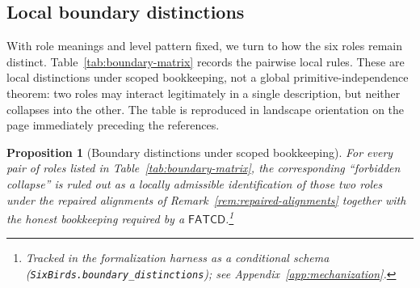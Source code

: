\documentclass[11pt]{article}
\newtheorem{proposition}[theorem]{Proposition}
\theoremstyle{definition}
\newcommand{\FATCD}{\ensuremath{\mathsf{FATCD}}}
\begin{document}
\subsection{Local boundary distinctions}\label{subsec:boundary-matrix}

With role meanings and level pattern fixed, we turn to how the six
roles remain distinct. Table~\ref{tab:boundary-matrix} records the
pairwise local rules. These are local distinctions under scoped
bookkeeping, not a global primitive-independence theorem: two roles
may interact legitimately in a single description, but neither
collapses into the other. The table is reproduced in landscape
orientation on the page immediately preceding the references.

\begin{proposition}[Boundary distinctions under scoped bookkeeping]\label{prop:boundary-distinctions}
For every pair of roles listed in Table~\ref{tab:boundary-matrix}, the
corresponding ``forbidden collapse'' is ruled out as a locally admissible
identification of those two roles under the repaired alignments of
Remark~\ref{rem:repaired-alignments} together with the honest bookkeeping
required by a \FATCD{}.\footnote{Tracked in the formalization harness as a conditional schema (\texttt{SixBirds.boundary\_distinctions}); see Appendix~\ref{app:mechanization}.}
\end{proposition}
\end{document}
